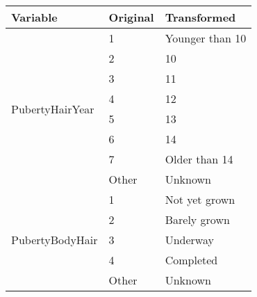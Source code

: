 \begin{table}[H]
	\centering

    \label{table:Table_Puberty_Info_Transform_Categories}
    
	\renewcommand{\arraystretch}{1.5}

    \begin{tabular}{l | l | l}
		\hline
        \rowcolor[HTML]{FF9999}		
		
        \textbf{Variable} & \textbf{Original} & \textbf{Transformed} \\ 		
        
        \hline 
                                    
            \multirow{8}{*}{PubertyHairYear}
                                    
                & \multicolumn{1}{l}{1}     & \multicolumn{1}{l}{Younger than 10}  \\\cline{2-3}
                & \multicolumn{1}{l}{2}     & \multicolumn{1}{l}{10}               \\\cline{2-3}
                & \multicolumn{1}{l}{3}     & \multicolumn{1}{l}{11}               \\\cline{2-3}
                & \multicolumn{1}{l}{4}     & \multicolumn{1}{l}{12}               \\\cline{2-3}
                & \multicolumn{1}{l}{5}     & \multicolumn{1}{l}{13}               \\\cline{2-3}
                & \multicolumn{1}{l}{6}     & \multicolumn{1}{l}{14}               \\\cline{2-3}
                & \multicolumn{1}{l}{7}     & \multicolumn{1}{l}{Older than 14}    \\\cline{2-3}
                & \multicolumn{1}{l}{Other} & \multicolumn{1}{l}{Unknown}          \\\hline
                                    
            \multirow{5}{*}{PubertyBodyHair}
				
            	& \multicolumn{1}{l}{1}     & \multicolumn{1}{l}{Not yet grown}    \\\cline{2-3}
                & \multicolumn{1}{l}{2}     & \multicolumn{1}{l}{Barely grown}     \\\cline{2-3}
                & \multicolumn{1}{l}{3}     & \multicolumn{1}{l}{Underway}         \\\cline{2-3}
			& \multicolumn{1}{l}{4}     & \multicolumn{1}{l}{Completed}        \\\cline{2-3}
                & \multicolumn{1}{l}{Other} & \multicolumn{1}{l}{Unknown}          \\\hline
                                    

\end{tabular}
\end{table}
